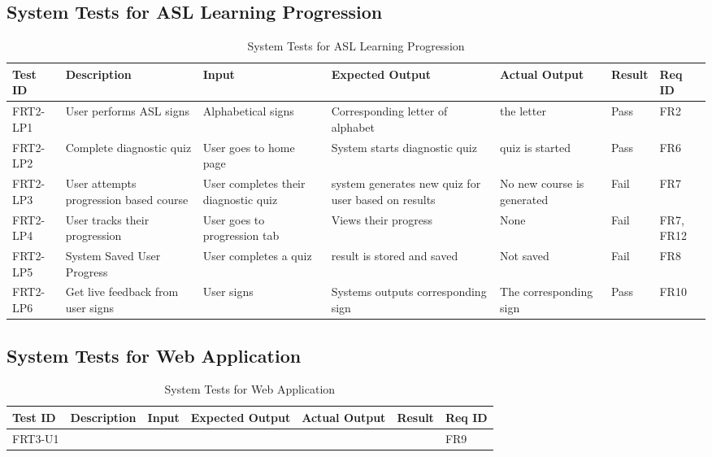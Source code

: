 \documentclass[12pt, titlepage]{article}
\begin{document}
\subsection{System Tests for ASL Learning Progression}
\begin{longtable}{|p{1cm}|p{2.25cm}|p{3cm}|p{3cm}|p{1.75cm}|p{1.25cm}|p{1cm}|}
  \caption{System Tests for ASL Learning Progression} \\
  \hline
  \textbf{Test ID} & \textbf{Description} & \textbf{Input} & \textbf{Expected Output} & \textbf{Actual Output} & \textbf{Result} & \textbf{Req ID}\\
  \hline
  FRT2-LP1 & User performs ASL signs & Alphabetical signs & Corresponding letter of alphabet & the letter & Pass & FR2 \\
  \hline
  FRT2-LP2 & Complete diagnostic quiz & User goes to home page & System starts diagnostic quiz & quiz is started & Pass & FR6 \\
  \hline
  FRT2-LP3 & User attempts progression based course & User completes their diagnostic quiz & system generates new quiz for user based on results & No new course is generated & Fail & FR7 \\
  \hline
  FRT2-LP4 & User tracks their progression & User goes to progression tab & Views their progress & None & Fail & FR7, FR12 \\
  \hline
  FRT2-LP5 & System Saved User Progress & User completes a quiz & result is stored and saved & Not saved & Fail & FR8 \\
  \hline
  FRT2-LP6 & Get live feedback from user signs & User signs & Systems outputs corresponding sign & The corresponding sign & Pass & FR10 \\
  \bottomrule
  \end{longtable}

\subsection{System Tests for Web Application}
\begin{longtable}{|p{1cm}|p{3cm}|p{2cm}|p{2cm}|p{2cm}|p{2cm}|p{1cm}|}
\caption{System Tests for Web Application} \\
\hline
\textbf{Test ID} & \textbf{Description} & \textbf{Input} & \textbf{Expected Output} & \textbf{Actual Output} & \textbf{Result} & \textbf{Req ID}\\
\hline
FRT3-U1 & & & & & & FR9 \\
\bottomrule
\end{longtable}
\end{document}
